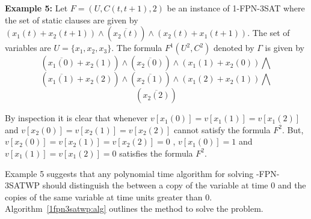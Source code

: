 	 
\noindent
{\bf Example 5:}
Let $F= (U,C(t,t+1),2)$
be an instance of  1-FPN-3SAT where the set of static clauses are given by
$(x_1(t) + x_2(t+1))  \wedge 
(\overline{x_2(t)}) \wedge (x_2(t) + x_1(t+1))$.
The set of variables are $U = \{ x_1, x_2, x_3 \}$.
The formula $F^1(U^2,C^2)$ denoted by $\Gamma$ is given by 
\[(\overline{x_1(0)} + x_2(1)) \wedge (\overline{x_2(0)}) 
\wedge (x_1(1) + x_2(0)) \bigwedge \]
\[(\overline{x_1(1)} + x_2(2)) \wedge (\overline{x_2(1)}) 
\wedge (x_1(2) + x_2(1)) \bigwedge \]
\[(\overline{x_2(2)}) \]

By inspection it is clear that whenever $v[x_1(0)] = v[x_1(1)] = v[x_1(2)]$ and
$v[x_2(0)] = v[x_2(1)] = v[x_2(2)]$ cannot satisfy the formula $F^2$. But,
$v[x_2(0)] = v[x_2(1)] = v[x_2(2)] =0$ , $v[x_1(0)] = 1$ and 
$v[x_1(1)] = v[x_1(2)] = 0$  satisfies the formula $F^2$.\QED 




Example  5 suggests that any polynomial time  algorithm for
solving {-FPN-3SATWP} should distinguish the between a copy of the
variable at time 0 and the copies of the same variable at time units greater
than 0.  
Algorithm~\ref{1fpn3satwp:alg} outlines the method to solve the problem.




\tinyspacing

